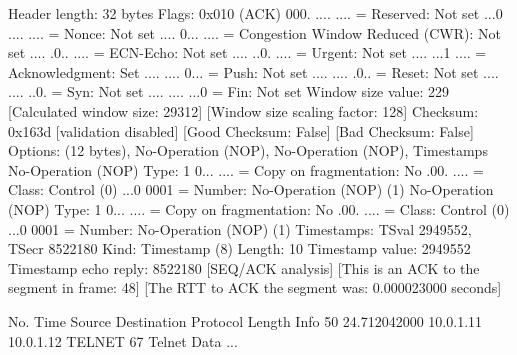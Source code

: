     Header length: 32 bytes
    Flags: 0x010 (ACK)
        000. .... .... = Reserved: Not set
        ...0 .... .... = Nonce: Not set
        .... 0... .... = Congestion Window Reduced (CWR): Not set
        .... .0.. .... = ECN-Echo: Not set
        .... ..0. .... = Urgent: Not set
        .... ...1 .... = Acknowledgment: Set
        .... .... 0... = Push: Not set
        .... .... .0.. = Reset: Not set
        .... .... ..0. = Syn: Not set
        .... .... ...0 = Fin: Not set
    Window size value: 229
    [Calculated window size: 29312]
    [Window size scaling factor: 128]
    Checksum: 0x163d [validation disabled]
        [Good Checksum: False]
        [Bad Checksum: False]
    Options: (12 bytes), No-Operation (NOP), No-Operation (NOP), Timestamps
        No-Operation (NOP)
            Type: 1
                0... .... = Copy on fragmentation: No
                .00. .... = Class: Control (0)
                ...0 0001 = Number: No-Operation (NOP) (1)
        No-Operation (NOP)
            Type: 1
                0... .... = Copy on fragmentation: No
                .00. .... = Class: Control (0)
                ...0 0001 = Number: No-Operation (NOP) (1)
        Timestamps: TSval 2949552, TSecr 8522180
            Kind: Timestamp (8)
            Length: 10
            Timestamp value: 2949552
            Timestamp echo reply: 8522180
    [SEQ/ACK analysis]
        [This is an ACK to the segment in frame: 48]
        [The RTT to ACK the segment was: 0.000023000 seconds]

No.     Time           Source                Destination           Protocol Length Info
     50 24.712042000   10.0.1.11             10.0.1.12             TELNET   67     Telnet Data ...


